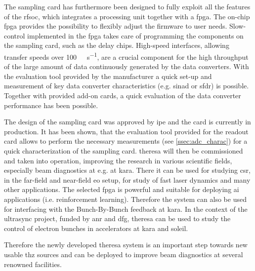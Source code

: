 The sampling card has furthermore been designed to fully exploit all the features of the \gls{rfsoc}, which integrates a processing unit together with a \gls{fpga}. 
The on-chip \gls{fpga} provides the possibility to flexibly adjust the firmware to user needs. 
Slow-control implemented in the \gls{fpga} takes care of programming the components on the sampling card, such as the delay chips.
High-speed interfaces, allowing transfer speeds over \SI{100}{\giga\bits\per\second}, are a crucial component for the high throughput of the large amount of data continuously generated by the data converters.
With the evaluation tool provided by the manufacturer a quick set-up and measurement of key data converter characteristics (e.g. \gls{sinad} or \gls{sfdr}) is possible. 
Together with provided add-on cards, a quick evaluation of the data converter performance has been possible.  %

The design of the sampling card was approved by \gls{ipe} and the card is currently in production.
It has been shown, that the evaluation tool provided for the readout card allows to perform the necessary measurements (see \autoref{ssec:adc_charac}) for a quick characterization of the sampling card.
\gls{theresa} will then be commissioned and taken into operation, improving the research in various scientific fields, especially beam diagnostics at e.g. at \gls{kara}. 
There it can be used for studying \gls{csr}, in the far-field and near-field \gls{eo} setup, for study of fast laser dynamics and many other applications.
The selected \gls{fpga} is powerful and suitable for deploying \gls{ai} applications (i.e. reinforcement learning).
Therefore the system can also be used for interfacing with the Bunch-By-Bunch feedback at \gls{kara}.
In the context of the \gls{ultrasync} project, funded by \gls{anr} and \gls{dfg}, \gls{theresa} can be used to study the control of electron bunches in accelerators at \gls{kara} and \gls{soleil}. 

Therefore the newly developed \gls{theresa} system is an important step towards new usable \gls{thz} sources and can be deployed to improve beam diagnostics at several renowned facilities. 
  

